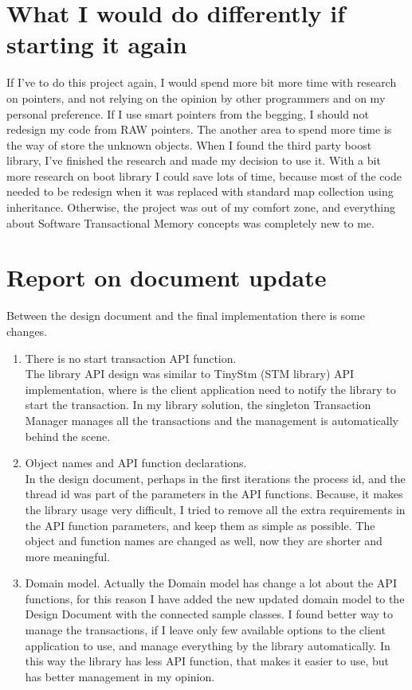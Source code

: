 \documentclass[12pt]{article}
\begin{document}
\section{What I would do differently if starting it again}
If I've to do this project again, I would spend more bit more time with research on pointers, and not relying on the opinion by other programmers and on my personal preference. If I use smart pointers from the begging, I should not redesign my code from RAW pointers. The another area to spend more time is the way of store the unknown objects. When I found the third party boost library, I've finished the research and made my decision to use it. With a bit more research on boot library I could save lots of time, because most of the code needed to be redesign when it was replaced with standard map collection using inheritance. Otherwise, the project was out of my comfort zone, and everything about Software Transactional Memory concepts was completely new to me.\\

\section{Report on document update}
Between the design document and the final implementation there is some changes.
\begin{enumerate}
\item There is no start transaction API function.\\
The library API design was similar to TinyStm (STM library) API implementation, where is the client application need to notify the library to start the transaction. In my library solution, the singleton Transaction Manager manages all the transactions and the management is automatically behind the scene.  
\item Object names and API function declarations.\\
In the design document, perhaps in the first iterations the process id, and the thread id was part of the parameters in the API functions. Because, it makes the library usage very difficult, I tried to remove all the extra requirements in the API function parameters, and keep them as simple as possible. The object and function names are changed as well, now they are shorter and more meaningful.
\item Domain model.
Actually the Domain model has change a lot about the API functions, for this reason I have added the new updated domain model to the Design Document with the connected sample classes. I found better way to manage the transactions, if I leave only few available options to the client application to use, and manage everything by the library automatically. In this way the library has less API function, that makes it easier to use, but has better management in my opinion. 
\end{enumerate}
\end{document}

